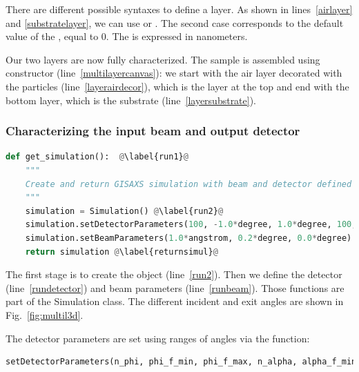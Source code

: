 There are different possible syntaxes to define a layer. As shown in
lines~\ref{airlayer} and \ref{substratelayer}, we can use
 or
. The second case corresponds
to the default value of the , equal to 0. The  is
expressed in  nanometers.

Our two layers are now fully characterized. The sample is assembled using
 constructor (line~\ref{multilayercanvas}): we start with the air layer decorated
with the particles (line~\ref{layerairdecor}), which is the layer at
the top and end with the bottom layer, which is the
substrate (line~\ref{layersubstrate}).

\subsubsection{Characterizing the input beam and output detector}

\begin{lstlisting}[language=python, style=eclipseboxed,name=ex1,nolol]
def get_simulation():  @\label{run1}@
    """
    Create and return GISAXS simulation with beam and detector defined
    """
    simulation = Simulation() @\label{run2}@
    simulation.setDetectorParameters(100, -1.0*degree, 1.0*degree, 100, 0.0*degree, 2.0*degree) @\label{rundetector}@
    simulation.setBeamParameters(1.0*angstrom, 0.2*degree, 0.0*degree) @\label{runbeam}@
    return simulation @\label{returnsimul}@
\end{lstlisting}
The first stage is to create the  object (line~\ref{run2}). Then we define the detector (line~\ref{rundetector}) and beam
parameters (line~\ref{runbeam}). %
Those functions are part of the Simulation
class.  The different incident and exit angles are
shown in Fig.~\ref{fig:multil3d}.

The detector parameters are set using ranges of angles via
the function:

\begin{lstlisting}[language=python, style=eclipse,numbers=none]
setDetectorParameters(n_phi, phi_f_min, phi_f_max, n_alpha, alpha_f_min, alpha_f_max),
\end{lstlisting}


